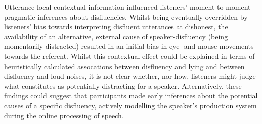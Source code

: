 \documentclass[a4paper,man,natbib]{apa6}
\begin{document}
% 

Utterance-local contextual information influenced listeners' moment-to-moment pragmatic inferences about disfluencies. 
Whilst being eventually overridden by listeners' bias towards interpreting disfluent utterances at dishonest, the availability of an alternative, external cause of speaker-disfluency (being momentarily distracted) resulted in an initial bias in eye- and mouse-movements towards the referent. 
Whilst this contextual effect could be explained in terms of heuristically calculated assocations between disfluency and lying and between disfluency and loud noises, it is not clear whether, nor how, listeners might judge what constitutes as potentially distracting for a speaker.
Alternatively, these findings could suggest that participants made early inferences about the potential causes of a specific disfluency, actively modelling the speaker's production system during the online processing of speech.



\end{document}

